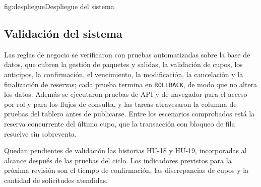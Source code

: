 \begin{figuraapa}{fig:despliegue}{Despliegue del sistema}
\end{figuraapa}

\subsection{Validación del sistema}

Las reglas de negocio se verificaron con pruebas automatizadas sobre la base
de datos, que cubren la gestión de paquetes y salidas, la validación de
cupos, los anticipos, la confirmación, el vencimiento, la modificación, la
cancelación y la finalización de reservas; cada prueba termina en
\texttt{ROLLBACK}, de modo que no altera los datos. Además se ejecutaron
pruebas de API y de navegador para el acceso por rol y para los flujos de
consulta, y las tareas atravesaron la columna de pruebas del tablero antes de
publicarse. Entre los escenarios comprobados está la reserva concurrente del
último cupo, que la transacción con bloqueo de fila resuelve sin sobreventa.

Quedan pendientes de validación las historias HU-18 y HU-19, incorporadas al
alcance después de las pruebas del ciclo. Los indicadores previstos para la
próxima revisión son el tiempo de confirmación, las discrepancias de cupos y
la cantidad de solicitudes atendidas.

